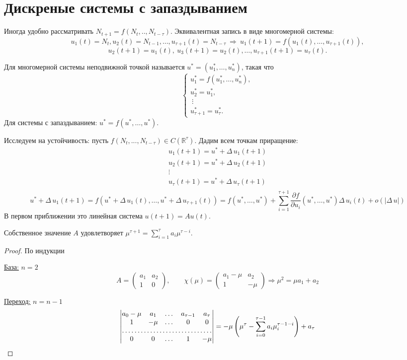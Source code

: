 \section{Дискреные системы с запаздыванием}
Иногда удобно рассматривать $N_{t+1}=f(N_t,..,N_{t-\tau})$. Эквивалентная запись в виде многомерной системы:
$$
u_1(t)=N_t,u_2(t)=N_{t-1},\dots,u_{\tau+1}(t)=N_{t-\tau}\:\Rightarrow\:
u_1(t+1)=f(u_1(t),\dots,u_{\tau+1}(t)),
$$
$$
u_2(t+1)=u_1(t),\ u_3(t+1)=u_2(t),\dots,u_{\tau+1}(t+1)=u_{\tau}(t).
$$
\begin{definition}
Для многомерной системы неподвижной точкой называется $u^*=(u_1^*,\dots,u_n^*)$, такая что 
$$\begin{cases}
u_1^* = f(u_1^*,\dots,u_n^*),\\
u_2^*=u_1^*,\\
\ \vdots\\
u_{\tau+1}^*=u_{\tau}^*.
\end{cases}$$
Для системы с запаздыванием: $ u^*=f(u^*,\dots,u^*).$
\end{definition}
Исследуем на устойчивость: пусть $f(N_t,...,N_{t-\tau})\in C(\mathbb{R}^{\tau})$. Дадим всем точкам приращение:
$$
\begin{array}{c}
u_1(t+1)=u^*+\Delta\,u_1(t+1)\\
u_2(t+1)=u^*+\Delta\,u_2(t+1)\\
\vdots\\
u_{\tau}(t+1)=u^*+\Delta\,u_{\tau}(t+1)\\
\end{array}
$$ 
$$
u^*+\Delta\,u_1(t+1)=f\left(u^*+\Delta\,u_1(t),\dots,u^*+\Delta\,u_{\tau+1}(t)\right)=f(u^*,\dots,u^*)+\sum\limits_{i=1}^{\tau+1}\dfrac{\partial f}{\partial u_i}(u^*,\dots,u^*)\Delta\,u_i(t)+o(|\Delta\,u|)
$$
В первом приближении это линейная система $u(t+1)=Au(t)$.
\begin{lemma}
Собственное значение $A$ удовлетворяет $\mu^{\tau+1}=\sum\limits_{i=1}^{\tau}a_i\mu^{\tau-i}$.
\end{lemma}
\begin{proof}
По индукции

\underline{База:} $n=2$ 
$$
A=\begin{pmatrix}
a_1 & a_2\\
1 & 0
\end{pmatrix},\qquad 
\chi(\mu)=\begin{pmatrix}
a_1-\mu & a_2\\
1 & -\mu
\end{pmatrix}
\Rightarrow \mu^2=\mu a_1+a_2
$$ 

\underline{Переход:} $n=n-1$
$$
\left|
\begin{matrix}
a_0-\mu & a_1  & \dots & a_{\tau-1} & a_{\tau} \\
1 		& -\mu & \dots &     0		& 0	  \\
 \hdotsfor{5} \\
0		& 0	   & \dots &  1	        & -\mu
\end{matrix}
\right| = -\mu\left(\mu^{\tau}-\sum\limits_{i=0}^{\tau-1}a_i\mu_i^{\tau-1-i}\right)+a_{\tau}
$$
\end{proof}
